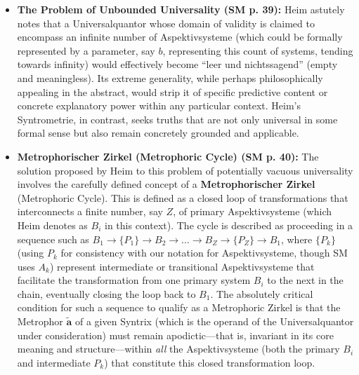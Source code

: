 \documentclass[12pt]{article}
\newcommand{\q}[1]{\enquote{#1}}
\newcommand{\metrophor}{\bm{\widetilde{a}}}
\begin{document}
\begin{itemize}
    \item \textbf{The Problem of Unbounded Universality (SM p. 39):}
    Heim astutely notes that a Universalquantor whose domain of validity is claimed to encompass an infinite number of Aspektivsysteme (which could be formally represented by a parameter, say \( b \), representing this count of systems, tending towards infinity) would effectively become \q{leer und nichtssagend} (empty and meaningless). Its extreme generality, while perhaps philosophically appealing in the abstract, would strip it of specific predictive content or concrete explanatory power within any particular context. Heim's Syntrometrie, in contrast, seeks truths that are not only universal in some formal sense but also remain concretely grounded and applicable.

    \item \textbf{Metrophorischer Zirkel (Metrophoric Cycle) (SM p. 40):}
    The solution proposed by Heim to this problem of potentially vacuous universality involves the carefully defined concept of a \textbf{Metrophorischer Zirkel} (Metrophoric Cycle). This is defined as a closed loop of transformations that interconnects a finite number, say \( Z \), of primary Aspektivsysteme (which Heim denotes as \( B_i \) in this context). The cycle is described as proceeding in a sequence such as \( B_1 \to \{P_1\} \to B_2 \to \dots \to B_Z \to \{P_Z\} \to B_1 \), where \( \{P_k\} \) (using \(P_k\) for consistency with our notation for Aspektivsysteme, though SM uses \(A_k\)) represent intermediate or transitional Aspektivsysteme that facilitate the transformation from one primary system \( B_i \) to the next in the chain, eventually closing the loop back to \( B_1 \). The absolutely critical condition for such a sequence to qualify as a Metrophoric Zirkel is that the Metrophor \( \metrophor \) of a given Syntrix (which is the operand of the Universalquantor under consideration) must remain apodictic—that is, invariant in its core meaning and structure—within \textit{all} the Aspektivsysteme (both the primary \(B_i\) and intermediate \(P_k\)) that constitute this closed transformation loop.


\end{itemize}
\end{document}
